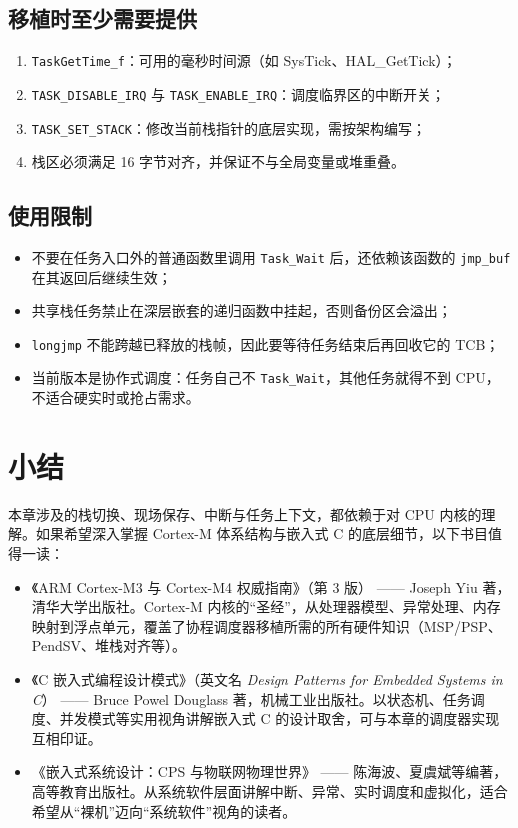 \subsection{移植时至少需要提供}

\begin{enumerate}
\item \texttt{TaskGetTime\_f}：可用的毫秒时间源（如 SysTick、HAL\_GetTick）；
\item \texttt{TASK\_DISABLE\_IRQ} 与 \texttt{TASK\_ENABLE\_IRQ}：调度临界区的中断开关；
\item \texttt{TASK\_SET\_STACK}：修改当前栈指针的底层实现，需按架构编写；
\item 栈区必须满足 16 字节对齐，并保证不与全局变量或堆重叠。
\end{enumerate}

\subsection{使用限制}

\begin{itemize}
\item 不要在任务入口外的普通函数里调用 \texttt{Task\_Wait} 后，还依赖该函数的 \texttt{jmp\_buf} 在其返回后继续生效；
\item 共享栈任务禁止在深层嵌套的递归函数中挂起，否则备份区会溢出；
\item \texttt{longjmp} 不能跨越已释放的栈帧，因此要等待任务结束后再回收它的 TCB；
\item 当前版本是协作式调度：任务自己不 \texttt{Task\_Wait}，其他任务就得不到 CPU，不适合硬实时或抢占需求。
\end{itemize}

\section{小结}

本章涉及的栈切换、现场保存、中断与任务上下文，都依赖于对 CPU 内核的理解。如果希望深入掌握 Cortex-M 体系结构与嵌入式 C 的底层细节，以下书目值得一读：

\begin{itemize}
	\item 《ARM Cortex-M3 与 Cortex-M4 权威指南》（第 3 版） —— Joseph Yiu 著，清华大学出版社。Cortex-M 内核的“圣经”，从处理器模型、异常处理、内存映射到浮点单元，覆盖了协程调度器移植所需的所有硬件知识（MSP/PSP、PendSV、堆栈对齐等）。
	\item 《C 嵌入式编程设计模式》（英文名 \textit{Design Patterns for Embedded Systems in C}） —— Bruce Powel Douglass 著，机械工业出版社。以状态机、任务调度、并发模式等实用视角讲解嵌入式 C 的设计取舍，可与本章的调度器实现互相印证。
	\item 《嵌入式系统设计：CPS 与物联网物理世界》 —— 陈海波、夏虞斌等编著，高等教育出版社。从系统软件层面讲解中断、异常、实时调度和虚拟化，适合希望从“裸机”迈向“系统软件”视角的读者。
\end{itemize}

